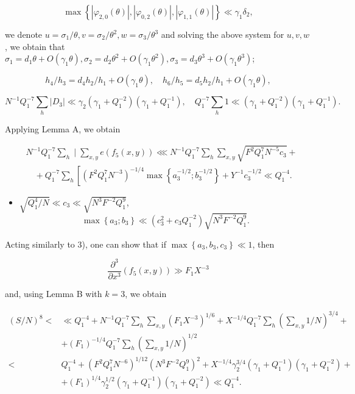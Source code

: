 \documentclass[10pt]{article}
\begin{document}
$$
\max \left\{\left|\varphi_{2,0}(\theta)\right|,\left|\varphi_{0,2}(\theta)\right|,\left|\varphi_{1,1}(\theta)\right|\right\} \ll \gamma_{1} \delta_{2},
$$

we denote $u=\sigma_{1} / \theta, v=\sigma_{2} / \theta^{2}, w=\sigma_{3} / \theta^{3}$ and solving the above system for $u, v, w$, we obtain that $\sigma_{1}=d_{1} \theta+O\left(\gamma_{1} \theta\right), \sigma_{2}=d_{2} \theta^{2}+O\left(\gamma_{1} \theta^{2}\right), \sigma_{3}=d_{3} \theta^{3}+O\left(\gamma_{1} \theta^{3}\right)$;

$$
h_{4} / h_{3}=d_{4} h_{2} / h_{1}+O\left(\gamma_{1} \theta\right), \quad h_{6} / h_{5}=d_{5} h_{2} / h_{1}+O\left(\gamma_{1} \theta\right),
$$

$$
N^{-1} Q_{1}^{-7} \sum_{h}\left|D_{3}\right| \ll \gamma_{2}\left(\gamma_{1}+Q_{1}^{-2}\right)\left(\gamma_{1}+Q_{1}^{-1}\right), \quad Q_{1}^{-7} \sum_{h} 1 \ll\left(\gamma_{1}+Q_{1}^{-2}\right)\left(\gamma_{1}+Q_{1}^{-1}\right) .
$$

Applying Lemma A, we obtain

$$
\begin{aligned}
& N^{-1} Q_{1}^{-7} \sum_{h} \mid \sum_{x, y} e\left(f_{5}(x, y)\right) \lll N^{-1} Q_{1}^{-7} \sum_{h} \sum_{x, y} \sqrt{F^{2} Q_{1}^{7} N^{-5} c_{3}}+ \\
& \quad+Q_{1}^{-7} \sum_{h}\left[\left(F^{2} Q_{1}^{7} N^{-3}\right)^{-1 / 4} \max \left\{a_{3}^{-1 / 2} ; b_{3}^{-1 / 2}\right\}+Y^{-1} c_{3}^{-1 / 2} \ll Q_{1}^{-4} .\right.
\end{aligned}
$$

\begin{itemize}
  \item[4)] $\sqrt{Q_{1}^{4} / N} \ll c_{3} \ll \sqrt{N^{3} F^{-2} Q_{1}^{9}}$,
$$
\max \left\{a_{3} ; b_{3}\right\} \ll\left(c_{3}^{2}+c_{3} Q_{1}^{-2}\right) \sqrt{N^{3} F^{-2} Q_{1}^{9}} .
$$
\end{itemize}

Acting similarly to 3), one can show that if $\max \left\{a_{3}, b_{3}, c_{3}\right\} \ll 1$, then

$$
\frac{\partial^{3}}{\partial x^{3}}\left(f_{5}(x, y)\right) \gg F_{1} X^{-3}
$$

and, using Lemma B with $k=3$, we obtain

$$
\begin{aligned}
(S / N)^{8}< & \ll Q_{1}^{-4}+N^{-1} Q_{1}^{-7} \sum_{h} \sum_{x, y}\left(F_{1} X^{-3}\right)^{1 / 6}+X^{-1 / 4} Q_{1}^{-7} \sum_{h}\left(\sum_{x, y} 1 / N\right)^{3 / 4}+ \\
& +\left(F_{1}\right)^{-1 / 4} Q_{1}^{-7} \sum_{h}\left(\sum_{x, y} 1 / N\right)^{1 / 2} \\
< & Q_{1}^{-4}+\left(F^{2} Q_{1}^{7} N^{-6}\right)^{1 / 12}\left(N^{3} F^{-2} Q_{1}^{9}\right)^{2}+X^{-1 / 4} \gamma_{2}^{3 / 4}\left(\gamma_{1}+Q_{1}^{-1}\right)\left(\gamma_{1}+Q_{1}^{-2}\right)+ \\
& +\left(F_{1}\right)^{1 / 4} \gamma_{2}^{1 / 2}\left(\gamma_{1}+Q_{1}^{-1}\right)\left(\gamma_{1}+Q_{1}^{-2}\right) \ll Q_{1}^{-4} .
\end{aligned}
$$
\end{document}
